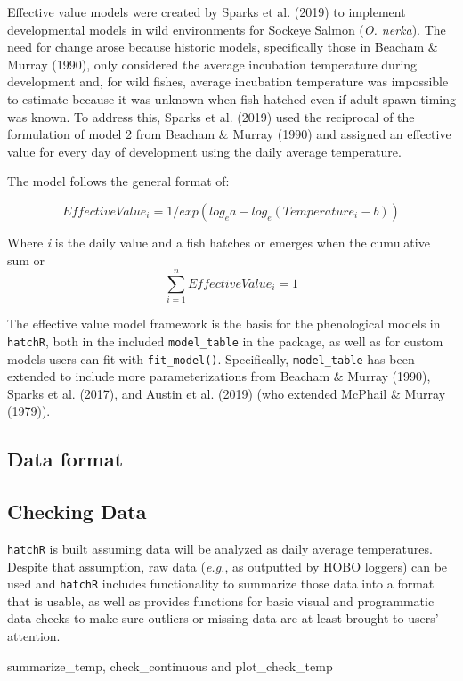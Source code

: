 \documentclass[10pt,a4paper,onecolumn]{article}
\begin{document}
Effective value models were created by Sparks et al. (2019) to implement
developmental models in wild environments for Sockeye Salmon (\emph{O.
nerka}). The need for change arose because historic models, specifically
those in Beacham \& Murray (1990), only considered the average
incubation temperature during development and, for wild fishes, average
incubation temperature was impossible to estimate because it was unknown
when fish hatched even if adult spawn timing was known. To address this,
Sparks et al. (2019) used the reciprocal of the formulation of model 2
from Beacham \& Murray (1990) and assigned an effective value for every
day of development using the daily average temperature.

The model follows the general format of:

\[
Effective Value_i = 1/exp(log_ea - log_e(Temperature_i - b))
\]

Where \emph{i} is the daily value and a fish hatches or emerges when the
cumulative sum or \[\sum_{i =1}^nEffectiveValue_i = 1\]

The effective value model framework is the basis for the phenological
models in \texttt{hatchR}, both in the included \texttt{model\_table} in
the package, as well as for custom models users can fit with
\texttt{fit\_model()}. Specifically, \texttt{model\_table} has been
extended to include more parameterizations from Beacham \& Murray
(1990), Sparks et al. (2017), and Austin et al. (2019) (who extended
McPhail \& Murray (1979)).

\subsection{Data format}\label{data-format}

\subsection{Checking Data}\label{checking-data}

\texttt{hatchR} is built assuming data will be analyzed as daily average
temperatures. Despite that assumption, raw data (\emph{e.g.}, as
outputted by HOBO loggers) can be used and \texttt{hatchR} includes
functionality to summarize those data into a format that is usable, as
well as provides functions for basic visual and programmatic data checks
to make sure outliers or missing data are at least brought to users'
attention.

summarize\_temp, check\_continuous and plot\_check\_temp
\end{document}
